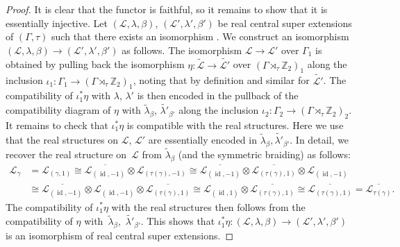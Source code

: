 \documentclass[pdftex]{sigma}
\numberwithin{equation}{section}
\def\mathscr#1{\EuScript{#1}}
\def\Z {\mathbb{Z}}
\newcommand{\id}{\operatorname{id}}
\begin{document}
\begin{proof}
It is clear that the functor is faithful, so it remains to show that it is essentially injective.
 Let $(\mathcal{L},\lambda,\beta)$, $(\mathcal{L}',\lambda',\beta')$ be real central super extensions of $(\Gamma,\tau)$ such that there exists an isomorphism
 \smash{$\eta \colon \bigl(\mathscr{I},\tilde{\mathcal{L}},\tilde{\lambda}_{\beta}\bigr) \to \bigl(\mathscr{I},\tilde{\mathcal{L}'},\tilde{\lambda'}_{\beta'}\bigr)$}. We construct an isomorphism
 $(\mathcal{L},\lambda,\beta) \to (\mathcal{L}',\lambda',\beta')$ as follows.
 The isomorphism $\mathcal{L} \to \mathcal{L}'$ over $\Gamma_1$ is obtained by pulling back the isomorphism $\eta \colon \tilde{\mathcal{L}} \to \tilde{\mathcal{L}'}$ over $(\Gamma \rtimes_{\tau} \Z_2)_1$
 along the inclusion $\iota_1 \colon \Gamma_1 \to (\Gamma \rtimes_{\tau} \Z_2)_1$, noting that  by definition
 and similar for $\tilde{\mathcal{L}'}$. The compatibility of $\iota_1^*\eta$ with $\lambda$, $\lambda'$ is then encoded in the pullback of the compatibility diagram
 of $\eta$ with $\tilde{\lambda}_{\beta}$, $\tilde{\lambda'}_{\beta'}$ along the inclusion $\iota_2 \colon \Gamma_2 \to (\Gamma \rtimes_{\tau} \Z_2)_2$. It remains to
 check that $\iota_1^*\eta$ is compatible with the real structures. Here we use that the real structures on $\mathcal{L}$, $\mathcal{L}'$ are essentially encoded in
 $\tilde{\lambda}_{\beta}, \tilde{\lambda'}_{\beta'}$. In detail, we recover the real structure on~$\mathcal{L}$ from $\tilde{\lambda}_{\beta}$ (and the symmetric braiding)
 as follows:
 \begin{align*}
 \mathcal{L}_\gamma
 &= \mathcal{L}_{(\gamma,1)} \cong \overline{\mathcal{L}_{(\id,-1)}} \otimes \mathcal{L}_{(\tau(\gamma),-1)}\cong \overline{\mathcal{L}_{(\id,-1)}} \otimes \overline{\mathcal{L}_{(\tau(\gamma),1)}} \otimes \mathcal{L}_{(\id,-1)} \\
 &\cong \overline{\mathcal{L}_{(\id,-1)}} \otimes \mathcal{L}_{(\id,-1)} \otimes \overline{\mathcal{L}_{(\tau(\gamma),1)}} \cong \mathcal{L}_{(\id,1)} \otimes \overline{\mathcal{L}_{(\tau(\gamma),1)}} \cong \overline{\mathcal{L}_{(\tau(\gamma),1)}}= \overline{\mathcal{L}_{\tau(\gamma)}}.
 \end{align*}
 The compatibility of $\iota_1^*\eta$ with the real structures then follows from the compatibility of $\eta$ with~$\tilde{\lambda}_{\beta}$,~$\tilde{\lambda'}_{\beta'}$.
 This shows that $\iota_1^*\eta \colon (\mathcal{L},\lambda,\beta) \to (\mathcal{L}',\lambda',\beta')$ is an isomorphism of real central super extensions.
\end{proof}
\end{document}
